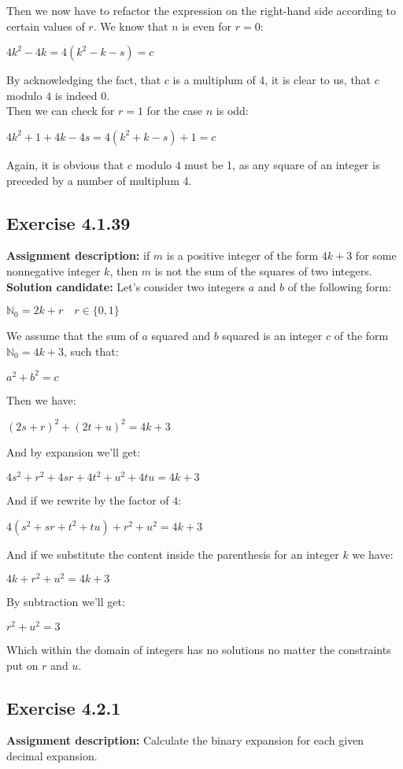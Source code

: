 \documentclass{report}
\newcommand{\cent}[1]{\begin{center}#1\end{center}}
\newcommand{\doubleN}{\mathbb{N}}
\newcommand{\In}{\! \in \!}
\newcommand{\assignmentDescription}{\textbf{Assignment description: }}
\newcommand{\solution}{\textbf{Solution candidate: }}
\newcommand{\QED}{\boxed{}}
\newcommand{\Exercise}[1]{\subsection{Exercise #1}}
\newcommand{\defaultEnumerateLabel}{\textbf{\alph*.}}
\begin{document}
\begin{enumerate}[label=\defaultEnumerateLabel]
	Then we now have to refactor the expression on the right-hand side according to certain values of $r$. We know that $n$ is even for $r=0$:
	
	\cent{$4k^2 - 4k = 4(k^2 - k - s) = c$}
	
	By acknowledging the fact, that $c$ is a multiplum of 4, it is clear to us, that $c$ modulo $4$ is indeed 0.\\
	
	Then we can check for $r=1$ for the case $n$ is odd:
	
	\cent{$4k^2 + 1 + 4k -4s = 4(k^2+k-s)+1 = c$}
	
	Again, it is obvious that $c$ modulo $4$ must be 1, as any square of an integer is preceded by a number of multiplum 4.\\
	
	\QED
	
	\Exercise{4.1.39}
	
	\assignmentDescription
	if $ m $ is a positive integer of the form $ 4k + 3 $ for some nonnegative integer $ k $, then $ m $ is not the sum of the squares of two integers.\\
	
	\solution
	Let's consider two integers $a$ and $b$ of the following form:
	
	\cent{$\doubleN_0 = 2k+r \quad r \In \{0,1\}$}
	
	We assume that the sum of $a$ squared and $b$ squared is an integer $c$ of the form $\doubleN_0 = 4k+3$, such that:
	
	\cent{$a^2 +b^2 = c$}
	
	Then we have:
	
	\cent{$(2s+r)^2 + (2t+u)^2 = 4k + 3$}
	
	And by expansion we'll get:
	
	\cent{$4s^2 + r^2 +4sr + 4t^2 + u^2 + 4tu = 4k + 3$}
	
	And if we rewrite by the factor of $4$:
	
	\cent{$4(s^2+sr+t^2+tu) + r^2 + u^2 = 4k + 3$}
	
	And if we substitute the content inside the parenthesis for an integer $k$ we have:
	
	\cent{$4k + r^2 + u^2 = 4k + 3$}
	
	By subtraction we'll get:
	
	\cent{$r^2 + u^2 = 3$}
	
	Which within the domain of integers has no solutions no matter the constraints put on $r$ and $u$.\\
	\QED
	\Exercise{4.2.1}
	\assignmentDescription Calculate the binary expansion for each given decimal expansion.\\
	

\end{enumerate}
\end{document}
